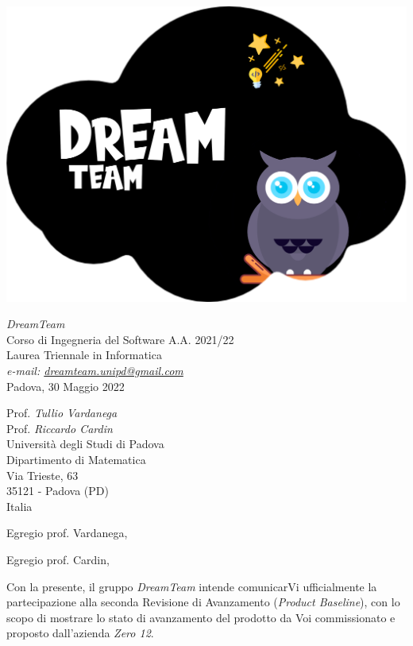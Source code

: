 \documentclass[a4paper]{scrlttr2}
\begin{document}
\includegraphics[scale=0.05]{DreamTeam.png}

\begin{flushright}
\textit{DreamTeam} \\
Corso di Ingegneria del Software A.A. 2021/22 \\
Laurea Triennale in Informatica \\
\textsl{e-mail: \href{mailto:dreamteam.unipd@gmail.com}{dreamteam.unipd@gmail.com}} \\
Padova, 30 Maggio 2022
\end{flushright}

\begin{flushleft}
{Prof. \textit{Tullio Vardanega} \\ Prof. \textit{Riccardo Cardin} \\
Università degli Studi di Padova \\
Dipartimento di Matematica \\
Via Trieste, 63 \\
35121 - Padova (PD) \\ 
Italia}
\end{flushleft}

\vspace*{15px}

Egregio prof. Vardanega,  

Egregio prof. Cardin, 

\vspace*{10px}

Con la presente, il gruppo \textit{DreamTeam} intende comunicarVi ufficialmente la partecipazione alla seconda Revisione di Avanzamento (\textit{Product Baseline}), con lo scopo di mostrare lo stato di avanzamento del prodotto da Voi commissionato e proposto dall'azienda \textit{Zero 12}.
\end{document}
